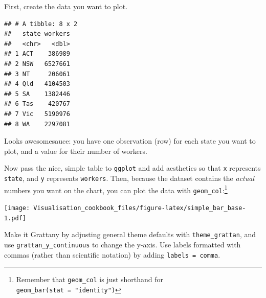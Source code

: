 \documentclass[]{book}
\newenvironment{Shaded}{\begin{snugshade}}{\end{snugshade}}
\newcommand{\DataTypeTok}[1]{\textcolor[rgb]{0.13,0.29,0.53}{#1}}
\newcommand{\DecValTok}[1]{\textcolor[rgb]{0.00,0.00,0.81}{#1}}
\newcommand{\KeywordTok}[1]{\textcolor[rgb]{0.13,0.29,0.53}{\textbf{#1}}}
\newcommand{\NormalTok}[1]{#1}
\newcommand{\OperatorTok}[1]{\textcolor[rgb]{0.81,0.36,0.00}{\textbf{#1}}}
\newcommand{\StringTok}[1]{\textcolor[rgb]{0.31,0.60,0.02}{#1}}
\begin{document}
First, create the data you want to plot.

\begin{Shaded}
\end{Shaded}

\begin{verbatim}
## # A tibble: 8 x 2
##   state workers
##   <chr>   <dbl>
## 1 ACT    386989
## 2 NSW   6527661
## 3 NT     206061
## 4 Qld   4104503
## 5 SA    1382446
## 6 Tas    420767
## 7 Vic   5190976
## 8 WA    2297081
\end{verbatim}

Looks awesomesauce: you have one observation (row) for each state you want to plot, and a value for their number of workers.

Now pass the nice, simple table to \texttt{ggplot} and add aesthetics so that \texttt{x} represents \texttt{state}, and \texttt{y} represents \texttt{workers}. Then, because the dataset contains the \emph{actual} numbers you want on the chart, you can plot the data with \texttt{geom\_col}:\footnote{Remember that \texttt{geom\_col} is just shorthand for \texttt{geom\_bar(stat\ =\ "identity")}}

\begin{Shaded}
\end{Shaded}

\texttt{[image: Visualisation\_cookbook\_files/figure-latex/simple\_bar\_base-1.pdf]}

Make it Grattany by adjusting general theme defaults with \texttt{theme\_grattan}, and use \texttt{grattan\_y\_continuous} to change the y-axis. Use labels formatted with commas (rather than scientific notation) by adding \texttt{labels\ =\ comma}.
\end{document}

